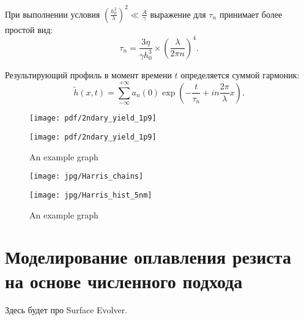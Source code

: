 При выполнении условия $\left(\frac{\displaystyle h_0^2}{\displaystyle \lambda}\right)^2 \ll \frac{\displaystyle A}{\displaystyle \gamma}$ выражение для $\tau_n$ принимает более простой вид:
\begin{equation}
	\tau_n=\frac{3 \eta}{\gamma h_0^3} \times\left(\frac{\lambda}{2 \pi n}\right)^4.
\end{equation}

Результирующий профиль в момент времени $t$ определяется суммой гармоник:
\begin{equation}
	\tilde{h}(x, t)=\sum_{-\infty}^{+\infty} a_n(0) \exp \left(-\frac{t}{\tau_n}+i n \frac{2 \pi}{\lambda} x\right).
\end{equation}


\begin{figure}
	\begin{minipage}{0.5\textwidth}
		\raggedright
		\texttt{[image: pdf/2ndary\_yield\_1p9]}
	\end{minipage}%
	\begin{minipage}{0.5\textwidth}
		\raggedleft
		\texttt{[image: pdf/2ndary\_yield\_1p9]}
	\end{minipage}%
	\caption{An example graph}
\end{figure}
	

\begin{figure}
	\begin{minipage}{0.5\textwidth}
		\raggedright
		\texttt{[image: jpg/Harris\_chains]}
	\end{minipage}%
	\begin{minipage}{0.5\textwidth}
		\raggedleft
		\texttt{[image: jpg/Harris\_hist\_5nm]}
	\end{minipage}%
	\caption{An example graph}
\end{figure}




\section{Моделирование оплавления резиста на основе численного подхода}
Здесь будет про Surface Evolver.







